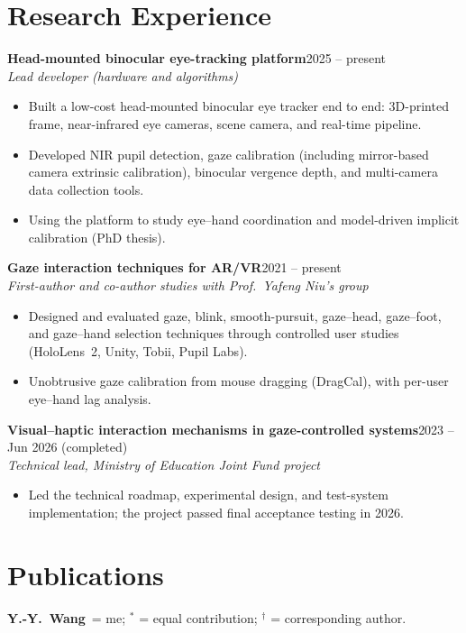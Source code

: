 \documentclass[10pt,a4paper]{article}
\newcommand{\entry}[3]{%
  \textbf{#1}\hfill{\color{muted}#2}\\
  {\itshape #3}\par\vspace{0.2ex}}
\newcommand{\me}{\textbf{Y.-Y.~Wang}}
\begin{document}
\section{Research Experience}
\entry{Head-mounted binocular eye-tracking platform}{2025 -- present}{Lead developer (hardware and algorithms)}
\begin{itemize}
  \item Built a low-cost head-mounted binocular eye tracker end to end: 3D-printed frame, near-infrared eye cameras, scene camera, and real-time pipeline.
  \item Developed NIR pupil detection, gaze calibration (including mirror-based camera extrinsic calibration), binocular vergence depth, and multi-camera data collection tools.
  \item Using the platform to study eye--hand coordination and model-driven implicit calibration (PhD thesis).
\end{itemize}
\entry{Gaze interaction techniques for AR/VR}{2021 -- present}{First-author and co-author studies with Prof.\ Yafeng Niu's group}
\begin{itemize}
  \item Designed and evaluated gaze, blink, smooth-pursuit, gaze--head, gaze--foot, and gaze--hand selection techniques through controlled user studies (HoloLens~2, Unity, Tobii, Pupil Labs).
  \item Unobtrusive gaze calibration from mouse dragging (DragCal), with per-user eye--hand lag analysis.
\end{itemize}
\entry{Visual--haptic interaction mechanisms in gaze-controlled systems}{2023 -- Jun 2026 (completed)}{Technical lead, Ministry of Education Joint Fund project}
\begin{itemize}
  \item Led the technical roadmap, experimental design, and test-system implementation; the project passed final acceptance testing in 2026.
\end{itemize}

\section{Publications}
{\small\color{muted} \me\ = me; $^{*}$ = equal contribution; $^{\dagger}$ = corresponding author.}
\end{document}

